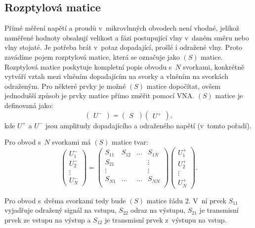 \documentclass{protokol}
\begin{document}
\subsection{Rozptylová matice}

Přímé měření napětí a proudů v~mikrovlnných obvodech není vhodné,
jelikož naměřené hodnoty obsahují velikost a fázi postupující vlny
v~daném směru nebo vlny stojaté.
Je potřeba brát v~potaz dopadající, prošlé i odražené vlny.
Proto zavádíme pojem rozptylová matice, která se označuje jako $(S)$ matice.%
\cite{Pozar}
Rozptylová matice poskytuje kompletní popis obvodu s~$N$ svorkami,
konkrétně vytváří vztah mezi vlněním dopadajícím na svorky
a vlněním na svorkách odraženým.
Pro některé prvky je možné $(S)$ matice dopočítat,
ovšem jednodušší způsob je prvky matice přímo změřit pomocí VNA.
$(S)$ matice je definovaná jako:
\[
\begin{pmatrix}
	U^-
\end{pmatrix}
=
\begin{pmatrix}
	S~\end{pmatrix}
%
\begin{pmatrix}
	U^+
\end{pmatrix}
,\]
kde $U^+$ a $U^-$ jsou amplitudy dopadajícího a odraženého napětí
(v~tomto pořadí).\cite{Pozar}

Pro obvod s~$N$ svorkami má $(S)$ matice tvar:
\[
\begin{pmatrix}
	U_1^-     \\
	U_2^-		\\
	\vdots	\\
	U_N^-
\end{pmatrix}
=
\begin{pmatrix}
	S_{11} & S_{12} & \dots & S_{1N}   \\
	S_{21} &		& 		& \vdots	\\
	\vdots &		& 		& \vdots	\\
	S_{N1} & \dots	& \dots & S_{NN} 	\\
\end{pmatrix}
%
\begin{pmatrix}
	U_1^+     \\
	U_2^+		\\
	\vdots	\\
	U_N^+
\end{pmatrix}
.\]

Pro obvod s~dvěma svorkami tedy bude $(S)$ matice řádu 2.
V~ní prvek $S_{11}$ vyjadřuje odražený signál na vstupu,
$S_{22}$ odraz na výstupu, $S_{21}$ je transmisní prvek ze vstupu na výstup
a $S_{12}$ je transmisní prvek z~výstupu na vstup.
\end{document}
